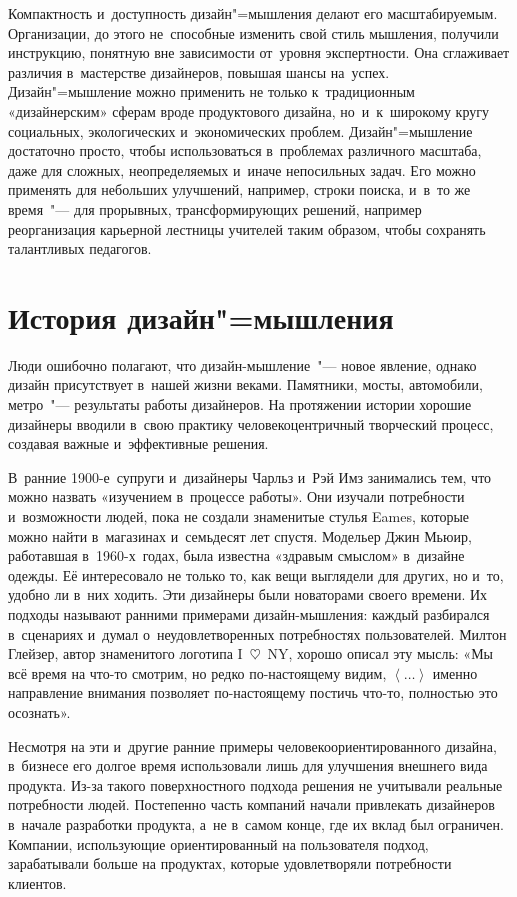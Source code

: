 \documentclass[12pt]{article}
\begin{document}
Компактность и~доступность дизайн"=мышления делают его масштабируемым. Организации, до этого не~способные изменить свой стиль мышления, получили инструкцию, понятную вне зависимости от~уровня экспертности. Она сглаживает различия в~мастерстве дизайнеров, повышая шансы на~успех. Дизайн"=мышление можно применить не только к~традиционным «дизайнерским» сферам вроде продуктового дизайна, но~и~к~широкому кругу социальных, экологических и~экономических проблем. Дизайн"=мышление достаточно просто, чтобы использоваться в~проблемах различного масштаба, даже для сложных, неопределяемых и~иначе непосильных задач. Его можно применять для небольших улучшений, например, строки поиска, и~в~то же время~"--- для прорывных, трансформирующих решений, например реорганизация карьерной лестницы учителей таким образом, чтобы сохранять талантливых педагогов.

\section{История дизайн"=мышления}

Люди ошибочно полагают, что дизайн-мышление~"--- новое явление, однако дизайн присутствует в~нашей жизни веками. Памятники, мосты, автомобили, метро~"--- результаты работы дизайнеров. На протяжении истории хорошие дизайнеры вводили в~свою практику человекоцентричный творческий процесс, создавая важные и~эффективные решения.

В~ранние 1900-е~супруги и~дизайнеры Чарльз и~Рэй Имз занимались тем, что можно назвать «изучением в~процессе работы». Они изучали потребности и~возможности людей, пока не создали знаменитые стулья Eames, которые можно найти в~магазинах и~семьдесят лет спустя. Модельер Джин Мьюир, работавшая в~1960-х~годах, была известна «здравым смыслом» в~дизайне одежды. Её интересовало не только то, как вещи выглядели для других, но и~то, удобно ли в~них ходить. Эти дизайнеры были новаторами своего времени. Их подходы называют ранними примерами дизайн-мышления: каждый разбирался в~сценариях и~думал о~неудовлетворенных потребностях пользователей. Милтон Глейзер, автор знаменитого логотипа I~$\heartsuit$~NY, хорошо описал эту мысль: «Мы всё время на что-то смотрим, но редко по-настоящему видим,
$\left<\dots\right>$
именно направление внимания позволяет по-настоящему постичь что-то, полностью это осознать».

Несмотря на эти и~другие ранние примеры человекоориентированного дизайна, в~бизнесе его долгое время использовали лишь для улучшения внешнего вида продукта. Из-за такого поверхностного подхода решения не учитывали реальные потребности людей. Постепенно часть компаний начали привлекать дизайнеров в~начале разработки продукта, а~не в~самом конце, где их вклад был ограничен. Компании, использующие ориентированный на пользователя подход, зарабатывали больше на продуктах, которые удовлетворяли потребности клиентов.
\end{document}
